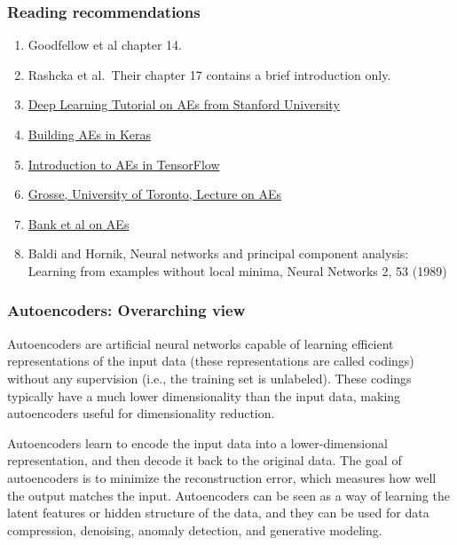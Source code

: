\documentclass{beamer}
\begin{document}
\begin{frame}
\frametitle{Reading recommendations}

\begin{block}{}
\begin{enumerate}
\item Goodfellow et al chapter 14.

\item Rashcka et al.~Their chapter 17 contains a brief introduction only.

\item \href{{http://ufldl.stanford.edu/tutorial/unsupervised/Autoencoders/}}{Deep Learning Tutorial on AEs from Stanford University}

\item \href{{https://blog.keras.io/building-autoencoders-in-keras.html}}{Building AEs in Keras}

\item \href{{https://www.tensorflow.org/tutorials/generative/autoencoder}}{Introduction to AEs in TensorFlow}

\item \href{{http://www.cs.toronto.edu/~rgrosse/courses/csc321_2017/slides/lec20.pdf}}{Grosse, University of Toronto, Lecture on AEs}

\item \href{{https://arxiv.org/abs/2003.05991}}{Bank et al on AEs}  

\item Baldi and Hornik, Neural networks and principal component analysis: Learning from examples without local minima, Neural Networks 2, 53 (1989)
\end{enumerate}

\noindent
\end{block}
\end{frame}

\begin{frame}
\frametitle{Autoencoders: Overarching view}

Autoencoders are artificial neural networks capable of learning
efficient representations of the input data (these representations are called codings)  without
any supervision (i.e., the training set is unlabeled). These codings
typically have a much lower dimensionality than the input data, making
autoencoders useful for dimensionality reduction. 

Autoencoders learn to encode the
input data into a lower-dimensional representation, and then decode it
back to the original data. The goal of autoencoders is to minimize the
reconstruction error, which measures how well the output matches the
input. Autoencoders can be seen as a way of learning the latent
features or hidden structure of the data, and they can be used for
data compression, denoising, anomaly detection, and generative
modeling.
\end{frame}
\end{document}
